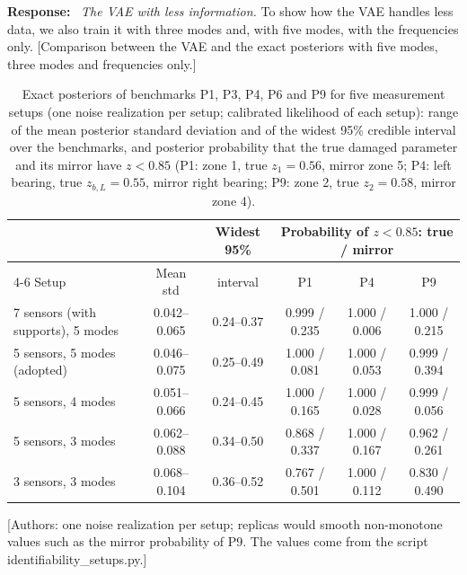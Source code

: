 \documentclass[11pt]{article}
\newenvironment{response}{\par\smallskip\noindent\color{resp}\textbf{Response:}\ }{\par}
\newcommand{\authornote}[1]{\textcolor{note}{\textsf{[Authors: #1]}}}
\newcommand{\tbd}[1]{\textcolor{note}{\textsf{[#1]}}}
\begin{document}
\begin{response}
\textit{The VAE with less information.} To show how the VAE handles less data, we also train it with three modes and,
with five modes, with the frequencies only. 
\tbd{Comparison between the VAE and the exact posteriors with five modes, three modes and frequencies only.}
\end{response}

\begin{table}[H]
\centering\small
\caption{Exact posteriors of benchmarks P1, P3, P4, P6 and P9 for five measurement setups (one noise realization per
setup; calibrated likelihood of each setup): range of the mean posterior standard deviation and of the widest 95\%
credible interval over the benchmarks, and posterior probability that the true damaged parameter and its mirror have
$z<0.85$ (P1: zone 1, true $z_1=0.56$, mirror zone 5; P4: left bearing, true $z_{b,L}=0.55$, mirror right bearing; P9:
zone 2, true $z_2=0.58$, mirror zone 4).}
\label{tab:modes}
\footnotesize\setlength{\tabcolsep}{4pt}
\begin{tabular}{lccccc}
\toprule
 & & Widest 95\% & \multicolumn{3}{c}{Probability of $z<0.85$: true / mirror} \\
\cmidrule(l){4-6}
Setup & Mean std & interval & P1 & P4 & P9 \\
\midrule
7 sensors (with supports), 5 modes & 0.042--0.065 & 0.24--0.37 & 0.999 / 0.235 & 1.000 / 0.006 & 1.000 / 0.215 \\
5 sensors, 5 modes (adopted) & 0.046--0.075 & 0.25--0.49 & 1.000 / 0.081 & 1.000 / 0.053 & 0.999 / 0.394 \\
5 sensors, 4 modes & 0.051--0.066 & 0.24--0.45 & 1.000 / 0.165 & 1.000 / 0.028 & 0.999 / 0.056 \\
5 sensors, 3 modes & 0.062--0.088 & 0.34--0.50 & 0.868 / 0.337 & 1.000 / 0.167 & 0.962 / 0.261 \\
3 sensors, 3 modes & 0.068--0.104 & 0.36--0.52 & 0.767 / 0.501 & 1.000 / 0.112 & 0.830 / 0.490 \\
\bottomrule
\end{tabular}
\end{table}
\authornote{one noise realization per setup; replicas would smooth non-monotone values such as the mirror probability of
P9. The values come from the script identifiability\_setups.py.}
\end{document}
